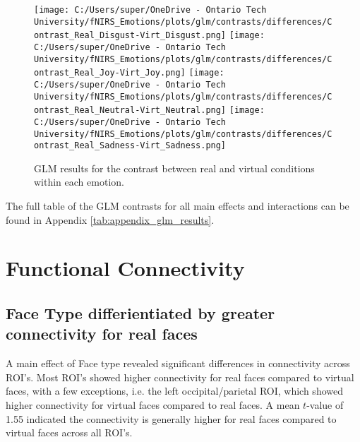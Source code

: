 \begin{figure}[H]
  \centering
  \texttt{[image: C:/Users/super/OneDrive - Ontario Tech University/fNIRS\_Emotions/plots/glm/contrasts/differences/Contrast\_Real\_Disgust-Virt\_Disgust.png]}
  \texttt{[image: C:/Users/super/OneDrive - Ontario Tech University/fNIRS\_Emotions/plots/glm/contrasts/differences/Contrast\_Real\_Joy-Virt\_Joy.png]}
  \texttt{[image: C:/Users/super/OneDrive - Ontario Tech University/fNIRS\_Emotions/plots/glm/contrasts/differences/Contrast\_Real\_Neutral-Virt\_Neutral.png]}
  \texttt{[image: C:/Users/super/OneDrive - Ontario Tech University/fNIRS\_Emotions/plots/glm/contrasts/differences/Contrast\_Real\_Sadness-Virt\_Sadness.png]}
  \caption[GLM: Face Type \texorpdfstring{$\times$}{x} Emotion Contrasts]{GLM results for the contrast between real and virtual conditions within each emotion.}
  \label{fig:glm_real_vs_virtual_emotion_analysis}
\end{figure}

The full table of the GLM contrasts for all main effects and interactions can be found in Appendix \ref{tab:appendix_glm_results}.

\section{Functional Connectivity}
\subsection{Face Type differientiated by greater connectivity for real faces}

A main effect of Face type revealed significant differences in connectivity across ROI's. 
Most ROI's showed higher connectivity for real faces compared to virtual faces, with a few exceptions, i.e. the left occipital/parietal ROI, which showed higher connectivity for virtual faces compared to real faces.
A mean $t$-value of 1.55 indicated the connectivity is generally higher for real faces compared to virtual faces across all ROI's. 

